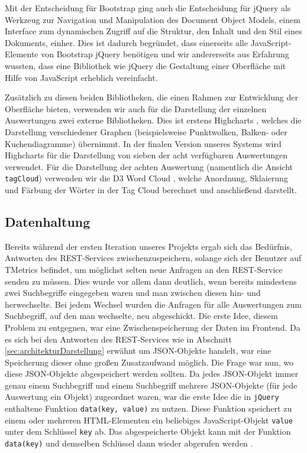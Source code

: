 Mit der Entscheidung für Bootstrap ging auch die Entscheidung für jQuery \cite{jQuery} als Werkzeug zur Navigation und Manipulation des Document Object Models, einem Interface zum dynamischen Zugriff auf die Struktur, den Inhalt und den Stil eines Dokuments, einher. Dies ist dadurch begründet, dass einerseits alle JavaScript-Elemente von Bootstrap jQuery benötigen und wir andererseits aus Erfahrung wussten, dass eine Bibliothek wie jQuery die Gestaltung einer Oberfläche mit Hilfe von JavaScript erheblich vereinfacht.

Zusätzlich zu diesen beiden Bibliotheken, die einen Rahmen zur Entwicklung der Oberfläche bieten, verwenden wir auch für die Darstellung der einzelnen Auswertungen zwei externe Bibliotheken.
Dies ist erstens Highcharts \cite{Highcharts}, welches die Darstellung verschiedener Graphen (beispielsweise Punktwolken, Balken- oder Kuchendiagramme) übernimmt. In der finalen Version unseres Systems wird Highcharts für die Darstellung von sieben der acht verfügbaren Auswertungen verwendet.
Für die Darstellung der achten Auswertung (namentlich die Ansicht \texttt{tagCloud}) verwenden wir die D3 Word Cloud \cite{D3TagCloud}, welche Anordnung, Sklaierung und Färbung der Wörter in der Tag Cloud berechnet und anschließend darstellt.

\subsection{Datenhaltung}
Bereits während der ersten Iteration unseres Projekts ergab sich das Bedürfnis, Antworten des REST-Services zwischenzuspeichern, solange sich der Benutzer auf TMetrics befindet, um möglichst selten neue Anfragen an den REST-Service senden zu müssen. Dies wurde vor allem dann deutlich, wenn bereits mindestens zwei Suchbegriffe eingegeben waren und man zwischen diesen hin- und herwechselte. Bei jedem Wechsel wurden die Anfragen für alle Auswertungen zum Suchbegriff, auf den man wechselte, neu abgeschickt.
Die erste Idee, diesem Problem zu entgegnen, war eine Zwischenspeicherung der Daten im Frontend. Da es sich bei den Antworten des REST-Services wie in Abschnitt \ref{sec:architekturDarstellung}
erwähnt um JSON-Objekte handelt, war eine Speicherung dieser ohne großen Zusatzaufwand möglich. Die Frage war nun, wo diese JSON-Objekte abgespeichert werden sollten. Da jedes JSON-Objekt immer genau einem Suchbegriff und einem Suchbegriff mehrere JSON-Objekte (für jede Auswertung ein Objekt) zugeordnet waren, war die erste Idee die in \texttt{jQuery} enthaltene Funktion \texttt{data(key, value)} zu nutzen. Diese Funktion speichert zu einem oder mehreren HTML-Elementen ein beliebiges JavaScript-Objekt \texttt{value} unter dem Schlüssel \texttt{key} ab. Das abgespeicherte Objekt kann mit der Funktion \texttt{data(key)} und demselben Schlüssel dann wieder abgerufen werden \cite{jQueryData}.

